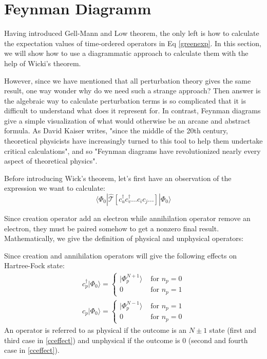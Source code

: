 \section{Feynman Diagramm}

Having introduced Gell-Mann and Low theorem, the only left is how to calculate the expectation values of time-ordered operators in Eq \ref{greenexp}.
In this section, we will show how to use a diagrammatic approach to calculate them with the help of Wicki's theorem.

However, since we have mentioned that all perturbation theory gives the same result, one way wonder why do we need such a strange approach?
Then answer is the algebraic way to calculate perturbation terms is so complicated that it is difficult to understand what does it represent for.
In contrast, Feynman diagrams give a simple visualization of what would otherwise be an arcane and abstract formula.
As David Kaiser writes, "since the middle of the 20th century, theoretical physicists have increasingly turned to this tool to help them undertake critical calculations", and so "Feynman diagrams have revolutionized nearly every aspect of theoretical physics". \cite{kaiser}

Before introducing Wick's theorem, let's first have an observation of the expression we want to calculate:
\begin{equation}
	\langle\Phi_{0}|
	\hat{\mathcal{T}} \left[ c_u^{\dagger} c_v^{\dagger} \ldots c_i c_j \ldots \right]
	| \Phi_{0}\rangle
\end{equation}

Since creation operator add an electron while annihilation operator remove an electron, they must be paired somehow to get a nonzero final result.
Mathematically, we give the definition of physical and unphysical operators:

Since creation and annihilation operators will give the following effects on Hartree-Fock state:
\begin{equation} \label{cceffect}
	\begin{aligned}
		c_{p}^{\dagger} | \Phi_{0} \rangle=\left\{\begin{array}{ll}{ | \Phi_{p}^{N+1} \rangle} & {\text { for } n_{p}=0} \\ {0} & {\text { for } n_{p}=1}\end{array}\right.
		\\
		c_{p} | \Phi_{0} \rangle=\left\{\begin{array}{ll}{ | \Phi_{p}^{N-1} \rangle} & {\text { for } n_{p}=1} \\ {0} & {\text { for } n_{p}=0}\end{array}\right.
	\end{aligned}
\end{equation}
An operator is referred to as physical if the outcome is an $N\pm 1$ state (first and third case in \ref{cceffect}) and unphysical if the outcome is 0 (second and fourth case in \ref{cceffect}).

